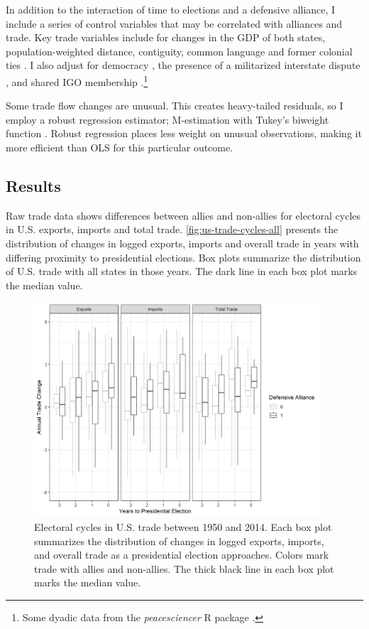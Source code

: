 \documentclass[12pt]{article}
\begin{document}
In addition to the interaction of time to elections and a defensive alliance, I include a series of control variables that may be correlated with alliances and trade. 
Key trade variables include for changes in the GDP of both states, population-weighted distance, contiguity, common language and former colonial ties \citep{FouquinHugot2016}.
I also adjust for democracy \citep{Marquez2016}, the presence of a militarized interstate dispute \citep{Gibleretal2016}, and shared IGO membership \citep{Pevehouseetal2020}.\footnote{Some dyadic data from the \textit{peacesciencer} \textsf{R} package \citep{peacesciencer-package}.}


Some trade flow changes are unusual. 
This creates heavy-tailed residuals, so I employ a robust regression estimator; M-estimation with Tukey's biweight function \citep{RaineyBaissa2020}.
Robust regression places less weight on unusual observations, making it more efficient than OLS for this particular outcome.



\subsection{Results}


Raw trade data shows differences between allies and non-allies for electoral cycles in U.S. exports, imports and total trade. 
\autoref{fig:us-trade-cycles-all} presents the distribution of changes in logged exports, imports and overall trade in years with differing proximity to presidential elections.
Box plots summarize the distribution of U.S. trade with all states in those years. 
The dark line in each box plot marks the median value. 


\begin{figure}
\centering
\includegraphics[width=0.95\textwidth]{../figures/us-trade-cycles-all.png}
\caption{Electoral cycles in U.S. trade between 1950 and 2014. Each box plot summarizes the distribution of changes in logged exports, imports, and overall trade as a presidential election approaches. Colors mark trade with allies and non-allies. The thick black line in each box plot marks the median value.}
\label{fig:us-trade-cycles-all}
\end{figure}
\end{document}
